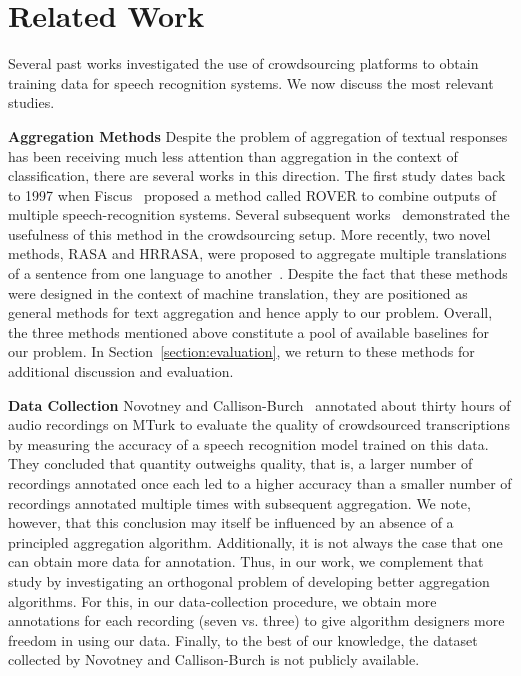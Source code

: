 \documentclass{article}
\begin{document}
\section{Related Work}
\label{section:related}

Several past works investigated the use of crowdsourcing platforms to obtain training data for speech recognition systems. We now discuss the most relevant studies. 

\textbf{Aggregation Methods} Despite the problem of aggregation of textual responses has been receiving much less attention than aggregation in the context of classification, there are several works in this direction.  The first study dates back to 1997 when Fiscus~\citep{fiscus97rover} proposed a method called ROVER to combine outputs of multiple speech-recognition systems. Several subsequent works~\citep{audhkhasi11accurate,evanini10nonnative,lee2011transcription,marge10turk} demonstrated the usefulness of this method in the crowdsourcing setup. More recently, two novel methods, RASA and HRRASA, were proposed to aggregate multiple translations of a sentence from one language to another~\citep{li20hrrasa,li19crowdwsa}. Despite the fact that these methods were designed in the context of machine translation, they are positioned as general methods for text aggregation and hence apply to our problem. Overall, the three methods mentioned above constitute a pool of available baselines for our problem. In Section~\ref{section:evaluation}, we return to these methods for additional discussion and evaluation.

\textbf{Data Collection} Novotney and Callison-Burch~\citep{novotney10cheap} annotated about thirty hours of audio recordings on MTurk to evaluate the quality of crowdsourced transcriptions by measuring the accuracy of a speech recognition model trained on this data. They concluded that quantity outweighs quality, that is, a larger number of recordings annotated once each  led to a higher accuracy than a smaller number of recordings annotated multiple times with subsequent aggregation. We note, however, that this conclusion may itself be influenced by an absence of a principled aggregation algorithm. Additionally, it is not always the case that one can obtain more data for annotation. Thus, in our work, we complement that study by investigating an orthogonal problem of developing better aggregation algorithms. For this, in our data-collection procedure, we obtain more annotations for each recording (seven vs. three) to give algorithm designers more freedom in using our data. Finally, to the best of our knowledge, the dataset collected by Novotney and Callison-Burch is not publicly available.
\end{document}
